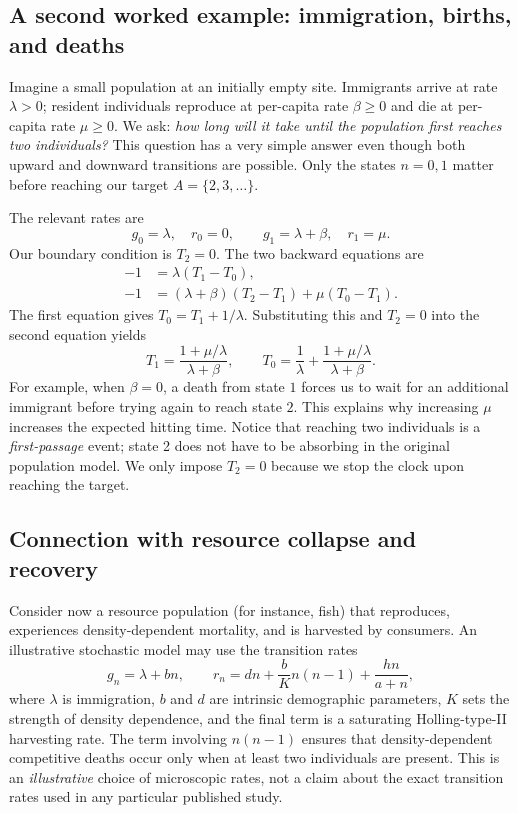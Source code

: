 \subsection{A second worked example: immigration, births, and deaths}
\label{subsec:mfpt-threshold-example}
Imagine a small population at an initially empty site. Immigrants arrive
at rate $\lambda>0$; resident individuals reproduce at per-capita rate
$\beta\geq0$ and die at per-capita rate $\mu\geq0$. We ask: \emph{how long
will it take until the population first reaches two individuals?} This
question has a very simple answer even though both upward and downward
transitions are possible. Only the states $n=0,1$ matter before reaching
our target $A=\{2,3,\ldots\}$.

The relevant rates are
\begin{equation}
 g_0=\lambda,\quad r_0=0,\qquad
 g_1=\lambda+\beta,\quad r_1=\mu.
\end{equation}
Our boundary condition is $T_2=0$. The two backward equations are
\begin{align}
 -1&=\lambda(T_1-T_0),\label{eq:mfpt-two-state-0}\\
 -1&=(\lambda+\beta)(T_2-T_1)+\mu(T_0-T_1).
 \label{eq:mfpt-two-state-1}
\end{align}
The first equation gives $T_0=T_1+1/\lambda$. Substituting this and
$T_2=0$ into the second equation yields
\begin{equation}
 \boxed{T_1=\frac{1+\mu/\lambda}{\lambda+\beta},\qquad
 T_0=\frac{1}{\lambda}+\frac{1+\mu/\lambda}{\lambda+\beta}.}
 \label{eq:mfpt-two-state-solution}
\end{equation}
For example, when $\beta=0$, a death from state $1$ forces us to wait for
an additional immigrant before trying again to reach state $2$. This
explains why increasing $\mu$ increases the expected hitting time. Notice
that reaching two individuals is a \emph{first-passage} event; state 2 does
not have to be absorbing in the original population model. We only impose
$T_2=0$ because we stop the clock upon reaching the target.

\subsection{Connection with resource collapse and recovery}
\label{subsec:mfpt-harvesting}
Consider now a resource population (for instance, fish) that reproduces,
experiences density-dependent mortality, and is harvested by consumers.
An illustrative stochastic model may use the transition rates
\begin{equation}
 g_n=\lambda+bn,
 \qquad
 r_n=dn+\frac{b}{K}n(n-1)+\frac{hn}{a+n},
 \label{eq:mfpt-harvest-rates}
\end{equation}
where $\lambda$ is immigration, $b$ and $d$ are intrinsic demographic
parameters, $K$ sets the strength of density dependence, and the final
term is a saturating Holling-type-II harvesting rate. The term involving
$n(n-1)$ ensures that density-dependent competitive deaths occur only
when at least two individuals are present. This is an \emph{illustrative}
choice of microscopic rates, not a claim about the exact transition rates
used in any particular published study.

